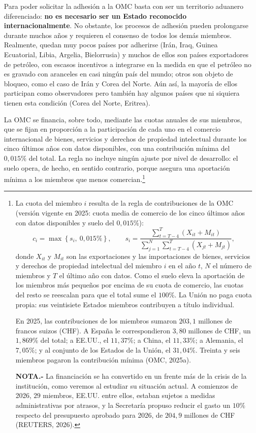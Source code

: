 \documentclass[10pt,a4paper]{article}
\begin{document}
Para poder solicitar la adhesión a la OMC basta con ser un territorio aduanero diferenciado: \textbf{no es necesario ser un Estado reconocido internacionalmente}. No obstante, los procesos de adhesión pueden prolongarse durante muchos años y requieren el consenso de todos los demás miembros. Realmente, quedan muy pocos países por adherirse (Irán, Iraq, Guinea Ecuatorial, Libia, Argelia, Bielorrusia) y muchos de ellos son países exportadores de petróleo, con escasos incentivos a integrarse en la medida en que el petróleo no es gravado con aranceles en casi ningún país del mundo; otros son objeto de bloqueo, como el caso de Irán y Corea del Norte. Aún así, la mayoría de ellos participan como observadores pero también hay algunos países que ni siquiera tienen esta condición (Corea del Norte, Eritrea). 

La OMC se financia, sobre todo, mediante las cuotas anuales de sus miembros, que se fijan en proporción a la participación de cada uno en el comercio internacional de bienes, servicios y derechos de propiedad intelectual durante los cinco últimos años con datos disponibles, con una contribución mínima del $0,015\%$ del total. La regla no incluye ningún ajuste por nivel de desarrollo: el suelo opera, de hecho, en sentido contrario, porque asegura una aportación mínima a los miembros que menos comercian.\footnote{%
  La cuota del miembro $i$ resulta de la regla de contribuciones de la OMC (versión vigente en 2025: cuota media de comercio de los cinco últimos años con datos disponibles y suelo del $0,015\%$):
  $$c_i = \max\left\{ s_i,\ 0{,}015\% \right\}, \qquad s_i = \frac{\sum_{t=T-4}^{T} \left(X_{it}+M_{it}\right)}{\sum_{j=1}^{N}\sum_{t=T-4}^{T} \left(X_{jt}+M_{jt}\right)},$$
  donde $X_{it}$ y $M_{it}$ son las exportaciones y las importaciones de bienes, servicios y derechos de propiedad intelectual del miembro $i$ en el año $t$, $N$ el número de miembros y $T$ el último año con datos. Como el suelo eleva la aportación de los miembros más pequeños por encima de su cuota de comercio, las cuotas del resto se reescalan para que el total sume el $100\%$. La Unión no paga cuota propia: sus veintisiete Estados miembros contribuyen a título individual.

  En 2025, las contribuciones de los miembros sumaron $203,1$ millones de francos suizos (CHF). A España le correspondieron $3,80$ millones de CHF, un $1,869\%$ del total; a EE.UU., el $11,37\%$; a China, el $11,33\%$; a Alemania, el $7,05\%$; y al conjunto de los Estados de la Unión, el $31,04\%$. Treinta y seis miembros pagaron la contribución mínima (OMC, 2025a).

  \textbf{NOTA.-} La financiación se ha convertido en un frente más de la crisis de la institución, como veremos al estudiar su situación actual. A comienzos de 2026, $29$ miembros, EE.UU. entre ellos, estaban sujetos a medidas administrativas por atrasos, y la Secretaría propuso reducir el gasto un $10\%$ respecto del presupuesto aprobado para 2026, de $204,9$ millones de CHF (REUTERS, 2026).
}
\end{document}
